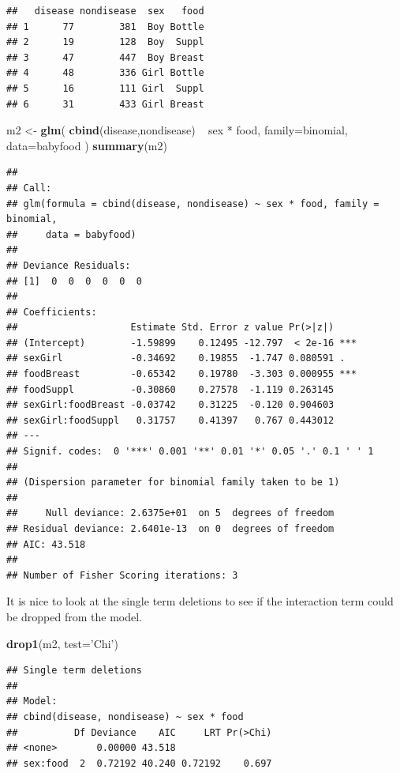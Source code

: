 \documentclass[]{book}
\newenvironment{Shaded}{\begin{snugshade}}{\end{snugshade}}
\newcommand{\KeywordTok}[1]{\textcolor[rgb]{0.13,0.29,0.53}{\textbf{{#1}}}}
\newcommand{\DataTypeTok}[1]{\textcolor[rgb]{0.13,0.29,0.53}{{#1}}}
\newcommand{\StringTok}[1]{\textcolor[rgb]{0.31,0.60,0.02}{{#1}}}
\newcommand{\NormalTok}[1]{{#1}}
\theoremstyle{definition}
\theoremstyle{definition}
\theoremstyle{remark}
\begin{document}
\begin{verbatim}
##   disease nondisease  sex   food
## 1      77        381  Boy Bottle
## 2      19        128  Boy  Suppl
## 3      47        447  Boy Breast
## 4      48        336 Girl Bottle
## 5      16        111 Girl  Suppl
## 6      31        433 Girl Breast
\end{verbatim}

\begin{Shaded}
\begin{Highlighting}[]
\NormalTok{m2 <-}\StringTok{ }\KeywordTok{glm}\NormalTok{( }\KeywordTok{cbind}\NormalTok{(disease,nondisease) ~}\StringTok{ }\NormalTok{sex *}\StringTok{ }\NormalTok{food, }\DataTypeTok{family=}\NormalTok{binomial, }\DataTypeTok{data=}\NormalTok{babyfood )}
\KeywordTok{summary}\NormalTok{(m2)}
\end{Highlighting}
\end{Shaded}

\begin{verbatim}
## 
## Call:
## glm(formula = cbind(disease, nondisease) ~ sex * food, family = binomial, 
##     data = babyfood)
## 
## Deviance Residuals: 
## [1]  0  0  0  0  0  0
## 
## Coefficients:
##                    Estimate Std. Error z value Pr(>|z|)    
## (Intercept)        -1.59899    0.12495 -12.797  < 2e-16 ***
## sexGirl            -0.34692    0.19855  -1.747 0.080591 .  
## foodBreast         -0.65342    0.19780  -3.303 0.000955 ***
## foodSuppl          -0.30860    0.27578  -1.119 0.263145    
## sexGirl:foodBreast -0.03742    0.31225  -0.120 0.904603    
## sexGirl:foodSuppl   0.31757    0.41397   0.767 0.443012    
## ---
## Signif. codes:  0 '***' 0.001 '**' 0.01 '*' 0.05 '.' 0.1 ' ' 1
## 
## (Dispersion parameter for binomial family taken to be 1)
## 
##     Null deviance: 2.6375e+01  on 5  degrees of freedom
## Residual deviance: 2.6401e-13  on 0  degrees of freedom
## AIC: 43.518
## 
## Number of Fisher Scoring iterations: 3
\end{verbatim}

It is nice to look at the single term deletions to see if the
interaction term could be dropped from the model.

\begin{Shaded}
\begin{Highlighting}[]
\KeywordTok{drop1}\NormalTok{(m2, }\DataTypeTok{test=}\StringTok{'Chi'}\NormalTok{)}
\end{Highlighting}
\end{Shaded}

\begin{verbatim}
## Single term deletions
## 
## Model:
## cbind(disease, nondisease) ~ sex * food
##          Df Deviance    AIC     LRT Pr(>Chi)
## <none>       0.00000 43.518                 
## sex:food  2  0.72192 40.240 0.72192    0.697
\end{verbatim}
\end{document}
